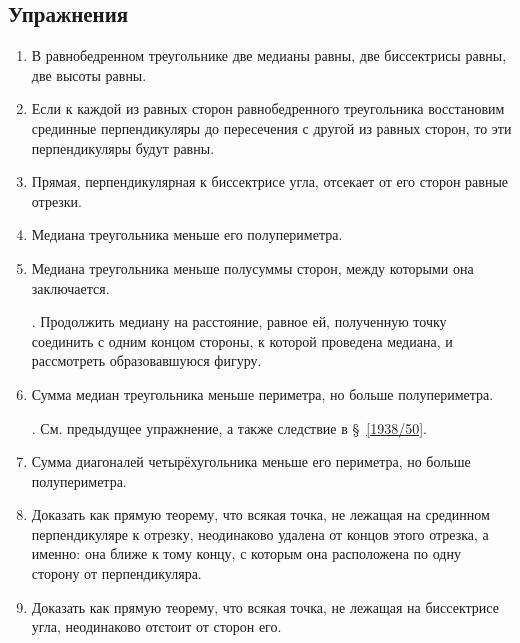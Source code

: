 {\small

\subsection*{Упражнения}

\begin{center}
\end{center}

\begin{enumerate}[noitemsep]

\item
В равнобедренном треугольнике две медианы равны, две биссектрисы равны, две высоты равны.

\item
Если к каждой из равных сторон равнобедренного треугольника восстановим срединные перпендикуляры до пересечения с другой из равных сторон, то эти перпендикуляры будут равны. 

\item
Прямая, перпендикулярная к биссектрисе угла, отсекает от его сторон равные отрезки.

\item
Медиана треугольника меньше его полупериметра.

\item
Медиана треугольника меньше полусуммы сторон, между которыми она заключается.

\smallskip
{}.
Продолжить медиану на расстояние, равное ей, полученную точку соединить с одним концом стороны, к которой проведена медиана, и рассмотреть образовавшуюся фигуру.

\item
Сумма медиан треугольника меньше периметра, но больше полупериметра.

\smallskip
{}.
См. предыдущее упражнение, а также следствие в §~\ref{1938/50}.

\item
Сумма диагоналей четырёхугольника меньше его периметра, но больше полупериметра.

\item
Доказать как прямую теорему, что всякая точка, не лежащая на срединном перпендикуляре к отрезку, неодинаково удалена от концов этого отрезка, а именно: 
она ближе к тому концу, с которым она расположена по одну сторону от перпендикуляра.

\item
Доказать как прямую теорему, что всякая точка, не лежащая на биссектрисе угла, неодинаково отстоит от сторон его.


\end{enumerate}}
